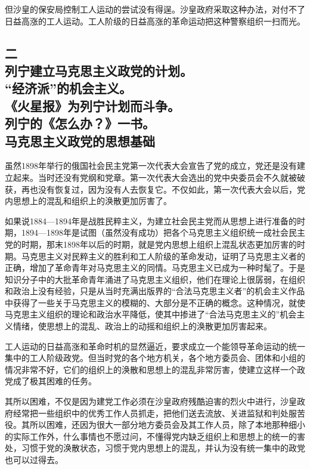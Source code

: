 但沙皇的保安局控制工人运动的尝试没有得逞。沙皇政府采取这种办法，对付不了日益高涨的工人运动。工人阶级的日益高涨的革命运动把这种警察组织一扫而光。

\subsection[二\q 列宁建立马克思主义政党的计划。“经济派”的机会主义。《火星报》为列宁计划而斗争。列宁的《怎么办？》一书。马克思主义政党的思想基础]{二\\ 列宁建立马克思主义政党的计划。\\ “经济派”的机会主义。\\ 《火星报》为列宁计划而斗争。\\ 列宁的《怎么办？》一书。\\ 马克思主义政党的思想基础}

虽然1898年举行的俄国社会民主党第一次代表大会宣告了党的成立，党还是没有建立起来。当时还没有党纲和党章。第一次代表大会选出的党中央委员会不久就被破获，再也没有恢复过，因为没有人去恢复它。不仅如此，第一次代表大会以后，党内思想上的混乱和组织上的涣散更加厉害了。

如果说1884—1894年是战胜民粹主义，为建立社会民主党而从思想上进行准备的时期，1894—1898年是试图（虽然没有成功）把各个马克思主义组织统一成社会民主党的时期，那末1898年以后的时期，就是党内思想上组织上混乱状态更加厉害的时期。马克思主义对民粹主义的胜利和工人阶级的革命发动，证明了马克思主义者的正确，增加了革命青年对马克思主义的同情。马克思主义已成为一种时髦了。于是知识分子中的大批革命青年涌进了马克思主义组织，他们在理论上很孱弱，在组织和政治上没有经验，只是从当时充满出版界的“合法马克思主义者”的机会主义作品中获得了一些关于马克思主义的模糊的、大部分是不正确的概念。这种情况，就使马克思主义组织的理论和政治水平降低，使其中掺进了“合法马克思主义的”机会主义情绪，使思想上的混乱、政治上的动摇和组织上的涣散更加厉害起来。

工人运动的日益高涨和革命时机的显然逼近，要求成立一个能领导革命运动的统一集中的工人阶级政党。但当时党的各个地方机关，各个地方委员会、团体和小组的情况非常不好，它们的组织上的涣散和思想上的混乱非常厉害，使建立这样一个政党成了极其困难的任务。

其所以困难，不仅是因为建党工作必须在沙皇政府残酷迫害的烈火中进行，沙皇政府经常把一些组织中的优秀工作人员抓走，把他们送去流放、关进监狱和判处服苦役。其所以困难，还因为很大一部分地方委员会及其工作人员，除了本地那种细小的实际工作外，什么事情也不愿过问，不懂得党内缺乏组织上和思想上的统一的害处，习惯于党的涣散状态，习惯于党内思想上的混乱，并认为没有统一集中的政党也可以过得去。

